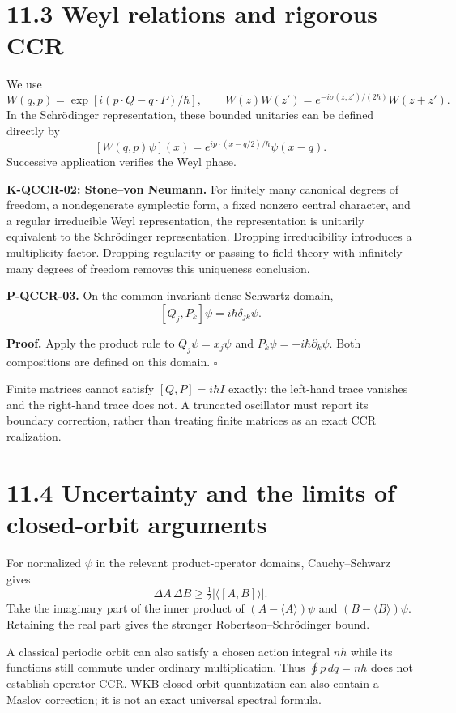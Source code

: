 \documentclass[
  11pt,
  oneside]{book}
\begin{document}
\section{11.3 Weyl relations and rigorous CCR}

We use \[
W(q,p)=\exp[i(p\cdot Q-q\cdot P)/\hbar],\qquad
W(z)W(z')=e^{-i\sigma(z,z')/(2\hbar)}W(z+z').
\] In the Schrödinger representation, these bounded unitaries can be
defined directly by \[
[W(q,p)\psi](x)=e^{ip\cdot(x-q/2)/\hbar}\psi(x-q).
\] Successive application verifies the Weyl phase.

\textbf{K-QCCR-02: Stone--von Neumann.} For finitely many canonical
degrees of freedom, a nondegenerate symplectic form, a fixed nonzero
central character, and a regular irreducible Weyl representation, the
representation is unitarily equivalent to the Schrödinger
representation. Dropping irreducibility introduces a multiplicity
factor. Dropping regularity or passing to field theory with infinitely
many degrees of freedom removes this uniqueness conclusion.

\label{p-qccr-03}{}

\textbf{P-QCCR-03.} On the common invariant dense Schwartz domain, \[
[Q_j,P_k]\psi=i\hbar\delta_{jk}\psi.
\]

\textbf{Proof.} Apply the product rule to \(Q_j\psi=x_j\psi\) and
\(P_k\psi=-i\hbar\partial_k\psi\). Both compositions are defined on this
domain. \(\square\)

Finite matrices cannot satisfy \([Q,P]=i\hbar I\) exactly: the left-hand
trace vanishes and the right-hand trace does not. A truncated oscillator
must report its boundary correction, rather than treating finite
matrices as an exact CCR realization.

\section{11.4 Uncertainty and the limits of closed-orbit arguments}

For normalized \(\psi\) in the relevant product-operator domains,
Cauchy--Schwarz gives \[
\Delta A\,\Delta B\ge\tfrac12|\langle[A,B]\rangle|.
\] Take the imaginary part of the inner product of
\((A-\langle A\rangle)\psi\) and \((B-\langle B\rangle)\psi\). Retaining
the real part gives the stronger Robertson--Schrödinger bound.

A classical periodic orbit can also satisfy a chosen action integral
\(nh\) while its functions still commute under ordinary multiplication.
Thus \(\oint p\,dq=nh\) does not establish operator CCR. WKB
closed-orbit quantization can also contain a Maslov correction; it is
not an exact universal spectral formula.
\end{document}
